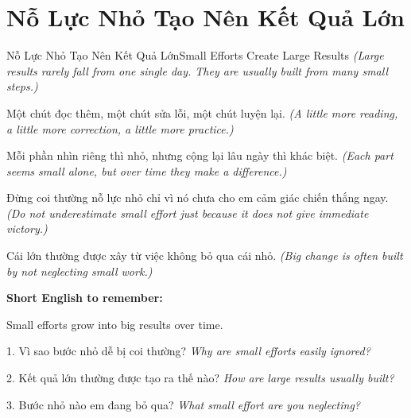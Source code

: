 \section{Nỗ Lực Nhỏ Tạo Nên Kết Quả Lớn}
\begin{truyen}{Nỗ Lực Nhỏ Tạo Nên Kết Quả Lớn}{Small Efforts Create Large Results}
\textit{(Large results rarely fall from one single day. They are usually built from many small steps.)}

Một chút đọc thêm, một chút sửa lỗi, một chút luyện lại.
\textit{(A little more reading, a little more correction, a little more practice.)}

Mỗi phần nhìn riêng thì nhỏ, nhưng cộng lại lâu ngày thì khác biệt.
\textit{(Each part seems small alone, but over time they make a difference.)}

Đừng coi thường nỗ lực nhỏ chỉ vì nó chưa cho em cảm giác chiến thắng ngay.
\textit{(Do not underestimate small effort just because it does not give immediate victory.)}
\end{truyen}

\begin{baihoc}
Cái lớn thường được xây từ việc không bỏ qua cái nhỏ.
\textit{(Big change is often built by not neglecting small work.)}
\end{baihoc}

\begin{ghinhoanh}
\textbf{Short English to remember:}

Small efforts grow into big results over time.

\end{ghinhoanh}

\begin{tuhocnhanh}
1. Vì sao bước nhỏ dễ bị coi thường? \textit{Why are small efforts easily ignored?}

2. Kết quả lớn thường được tạo ra thế nào? \textit{How are large results usually built?}

3. Bước nhỏ nào em đang bỏ qua? \textit{What small effort are you neglecting?}
\end{tuhocnhanh}
\ngancach

